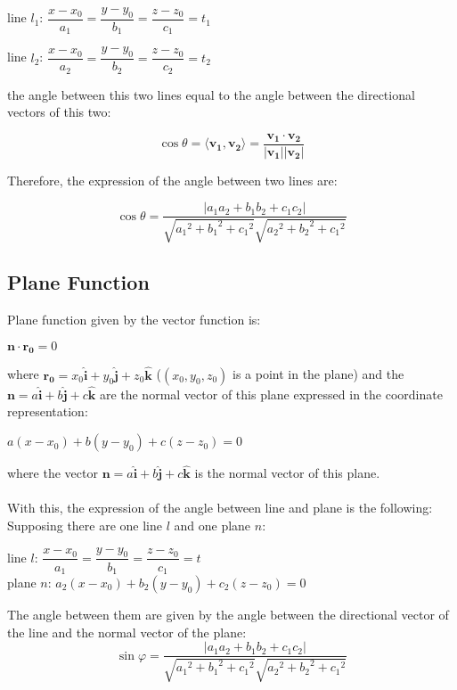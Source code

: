 \documentclass[UTF8,a4paper, 10pt, openany]{svmono}
\begin{document}
\begin{center}
line $l_1$: $\dfrac{x-x_0}{a_1}=\dfrac{y-y_0}{b_1}=\dfrac{z-z_0}{c_1}=t_1$

line $l_2$: $\dfrac{x-x_0}{a_2}=\dfrac{y-y_0}{b_2}=\dfrac{z-z_0}{c_2}=t_2$
\end{center}

the angle between this two lines equal to the angle between the directional vectors of this two:

\[\cos \theta = \langle \mathbf{v_1},\mathbf{v_2} \rangle =\frac{\mathbf{v_1}\cdot \mathbf{v_2}}{|\mathbf{v_1}||\mathbf{v_2}|}\]

Therefore, the expression of the angle between two lines are:

\begin{equation}
\boxed{\cos \theta =\dfrac{|a_1a_2+b_1b_2+c_1c_2|}{\sqrt{{a_1}^2+{b_1}^2+{c_1}^2}\sqrt{{a_2}^2+{b_2}^2+{c_1}^2}}}
\end{equation}

\subsection{Plane Function}
Plane function given by the vector function is:
\begin{center}
$\mathbf{n}\cdot \mathbf{r_0}=0$\\
\end{center}
where $\mathbf{r_0}=x_0\mathbf{\hat{i}}+y_0\mathbf{\hat{j}}+z_0\mathbf{\hat{k}}$ ($(x_0,y_0,z_0)$ is a point in the plane) and the $\mathbf{n}=a\mathbf{\hat{i}}+b\mathbf{\hat{j}}+c\mathbf{\hat{k}}$ are the normal vector of this plane
expressed in the coordinate representation:
\begin{center}
$a(x-x_0)+b(y-y_0)+c(z-z_0)=0$
\end{center}
where the vector $\mathbf{n}=a\mathbf{\hat{i}}+b\mathbf{\hat{j}}+c\mathbf{\hat{k}}$ is the normal vector of this plane.\\ \\
With this, the expression of the angle between line and plane is the following:\\
Supposing there are one line $l$ and one plane $n$:
\begin{center}
line $l$: $\dfrac{x-x_0}{a_1}=\dfrac{y-y_0}{b_1}=\dfrac{z-z_0}{c_1}=t$\\
plane $n$: $a_2(x-x_0)+b_2(y-y_0)+c_2(z-z_0)=0$
\end{center}
The angle between them are given by the angle between the directional vector of the line and the normal vector of the plane:
\begin{equation}
\boxed{\sin \varphi =\dfrac{|a_1a_2+b_1b_2+c_1c_2|}{\sqrt{{a_1}^2+{b_1}^2+{c_1}^2}\sqrt{{a_2}^2+{b_2}^2+{c_1}^2}}}
\end{equation}
\end{document}
